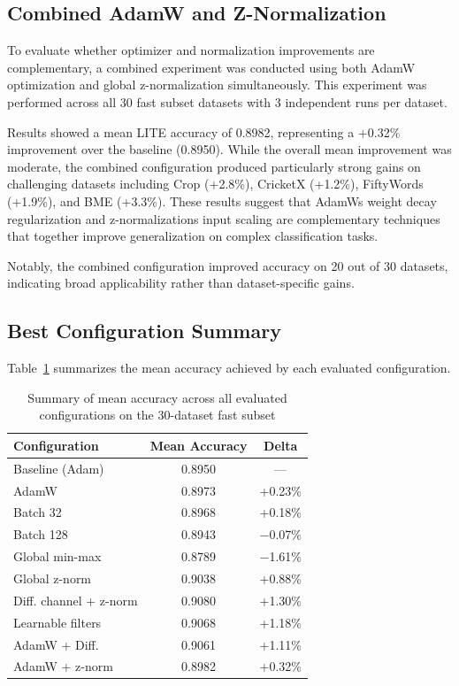 \documentclass[conference]{IEEEtran}
\begin{document}
\subsection{Combined AdamW and Z-Normalization}

To evaluate whether optimizer and normalization improvements are complementary, a combined experiment was conducted using both AdamW optimization and global z-normalization simultaneously. This experiment was performed across all 30 fast subset datasets with 3 independent runs per dataset.

Results showed a mean LITE accuracy of 0.8982, representing a +0.32\% improvement over the baseline (0.8950). While the overall mean improvement was moderate, the combined configuration produced particularly strong gains on challenging datasets including Crop (+2.8\%), CricketX (+1.2\%), FiftyWords (+1.9\%), and BME (+3.3\%). These results suggest that AdamW\textquotesingle s weight decay regularization and z-normalization\textquotesingle s input scaling are complementary techniques that together improve generalization on complex classification tasks.

Notably, the combined configuration improved accuracy on 20 out of 30 datasets, indicating broad applicability rather than dataset-specific gains.

\subsection{Best Configuration Summary}

Table~\ref{tab:config_summary} summarizes the mean accuracy achieved by each evaluated configuration.

\begin{table}[h]
    \centering
    \caption{Summary of mean accuracy across all evaluated configurations on the 30-dataset fast subset}
    \label{tab:config_summary}
    \begin{tabular}{lcc}
        \toprule
        Configuration          & Mean Accuracy & Delta     \\
        \midrule
        Baseline (Adam)        & 0.8950        & ---       \\
        AdamW                  & 0.8973        & +0.23\%   \\
        Batch 32               & 0.8968        & +0.18\%   \\
        Batch 128              & 0.8943        & $-$0.07\% \\
        Global min-max         & 0.8789        & $-$1.61\% \\
        Global z-norm          & 0.9038        & +0.88\%   \\
        Diff. channel + z-norm & 0.9080        & +1.30\%   \\
        Learnable filters      & 0.9068        & +1.18\%   \\
        AdamW + Diff.          & 0.9061        & +1.11\%   \\
        AdamW + z-norm         & 0.8982        & +0.32\%   \\
        \bottomrule
    \end{tabular}
\end{table}
\end{document}
